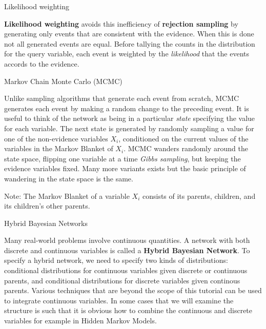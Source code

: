 \documentclass[12pt]{beamer}
\begin{document}
\begin{frame}{Likelihood weighting}
  
  {\bf Likelihood weighting} avoids this inefficiency of {\bf
    rejection sampling} by generating only events that are consistent
  with the evidence. When this is done not all generated events are
  equal. Before tallying the counts in the distribution for the query
  variable, each event is weighted by the {\it likelihood} that the
  events accords to the evidence.
  \end{frame} 

\begin{frame}{Markov Chain Monte Carlo (MCMC)}

  Unlike sampling algorithms that generate each event from scratch,
  MCMC generates each event by making a random change to the preceding
  event. It is useful to think of the network as being in a particular
  {\it state} specifying the value for each variable. The next state
  is generated by randomly sampling a value for one of the
  non-evidence variables $X_i$, conditioned on the current values of
  the variables in the Markov Blanket of $X_i$. MCMC wanders randomly
  around the state space, flipping one variable at a time {\it Gibbs
    sampling}, but keeping the evidence variables fixed. Many more
  variants exists but the basic principle of wandering in the state
  space is the same.

  Note: The Markov Blanket of a variable $X_i$ consists of its
  parents, children, and its children's other parents.
  
  \end{frame} 


\begin{frame}{Hybrid Bayesian Networks}

  Many real-world problems involve continuous quantities. A network
  with both discrete and continuous variables is called a {\bf Hybrid
    Bayesian Network}. To specify a hybrid network, we need to specify
  two kinds of distributions: conditional distributions for continuous
  variables given discrete or continuous parents, and conditional
  distributions for discrete variables given continous
  parents. Various techniques that are beyond the scope of this
  tutorial can be used to integrate continuous variables. In some
  cases that we will examine the structure is such that it is obvious
  how to combine the continuous and discrete variables for example in
  Hidden Markov Models.

  \end{frame} 
\end{document}
